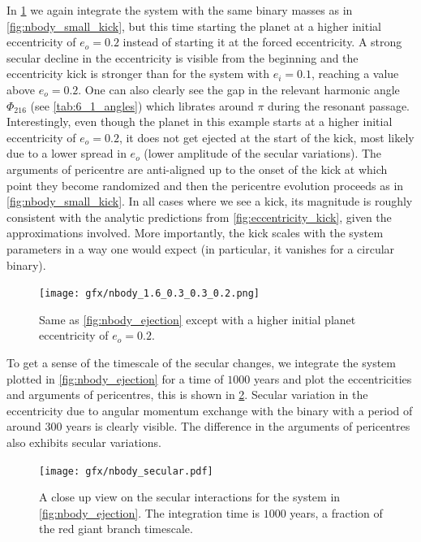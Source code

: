 \documentclass[twoside,openright,titlepage,numbers=noenddot,headinclude,%
                footinclude=true,cleardoublepage=empty,abstractoff, 
                BCOR=5mm,paper=a4,fontsize=11pt,%
                american,%
                ]{scrreprt}%
\begin{document}
In \cref{fig:nbody_large_kick} we again integrate the system with the
same binary masses as in \cref{fig:nbody_small_kick}, but this time 
starting the planet at a higher 
initial eccentricity of $e_o=0.2$ instead of starting it at the forced 
eccentricity. A strong secular decline in the eccentricity is visible from
the beginning and the eccentricity kick is stronger than for
the system with $e_i=0.1$, reaching
a value above $e_o=0.2$. One can also clearly see the gap in the relevant
harmonic angle $\Phi_{216}$ (see \cref{tab:6_1_angles}) which librates around
$\pi$ during the resonant passage.
Interestingly, even though the planet in this example
starts at a higher initial eccentricity of $e_o=0.2$, it does not get
ejected at the start of the kick, most likely due to a lower spread
in $e_o$ (lower amplitude of the secular variations). The arguments of 
pericentre are anti-aligned 
up to the onset of the kick at which point they become randomized and 
then the pericentre evolution proceeds as in \cref{fig:nbody_small_kick}.
In all cases where we see a kick, its magnitude is roughly consistent with 
the analytic predictions from \cref{fig:eccentricity_kick}, given the 
approximations involved. More importantly, the kick scales with the system
parameters in a way one would expect (in particular, it vanishes for a 
circular binary).
\begin{figure}[t]
\centering
    \texttt{[image: gfx/nbody\_1.6\_0.3\_0.3\_0.2.png]}
    \caption{Same as \cref{fig:nbody_ejection} except with a higher initial
    planet eccentricity of $e_o=0.2$.}
\label{fig:nbody_large_kick}
\end{figure}

To get a sense of the timescale of the secular changes, we integrate the
system plotted in \cref{fig:nbody_ejection} for a time of $1000$ years and
plot the eccentricities and arguments of pericentres, this is shown
in \cref{fig:nbody_secular}. Secular variation in the eccentricity due to
angular momentum exchange with the binary with 
a period of around $300$ years is clearly visible. The difference in the 
arguments of pericentres also exhibits secular variations.
\begin{figure}[t]
\centering
\texttt{[image: gfx/nbody\_secular.pdf]}
\caption{A close up view on the secular interactions for the system in
    \cref{fig:nbody_ejection}. The integration time is $1000$ years,
    a fraction of the red giant branch timescale.}
\label{fig:nbody_secular}
\end{figure}
\end{document}

